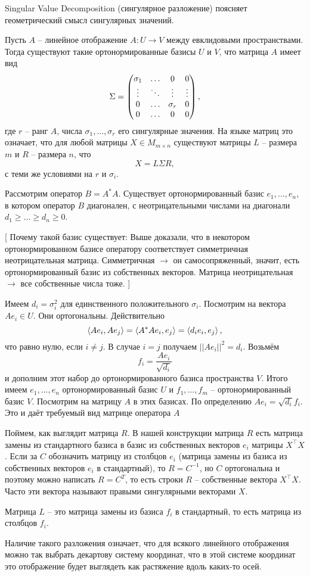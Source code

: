Singular Value Decomposition (сингулярное разложение) поясняет геометрический смысл сингулярных значений.

 Пусть $A$ -- линейное отображение $A\colon U \to V$ между евклидовыми пространствами. Тогда существуют такие ортонормированные базисы $U$ и $V$, что матрица $A$ имеет вид 
$$\Sigma = \begin{pmatrix} \sigma_1 &\dots& 0 & 0\\
 \vdots & \ddots &\vdots & \vdots\\
 0 & \dots & \sigma_r & 0\\
 0 &  \dots & 0 & 0 \end{pmatrix},$$
 где $r$ -- ранг $A$, числа $\sigma_1, \dots, \sigma_r$ его сингулярные значения.
На языке матриц это означает, что для любой матрицы $X \in M_{m\times n}$ существуют матрицы $L$ -- размера $m$ и $R$ -- размера $n$,  что
$$X= L \Sigma R,$$
 с теми же условиями на $r$ и $\sigma_i$.
 
\proof Рассмотрим оператор $B = A^{*}A$. Существует ортонормированный базис $e_1,\dots,e_n$, в котором оператор $B$ диагонален, с неотрицательными числами на диагонали $d_1\geq\dots\geq d_n\geq 0$. 

[ Почему такой базис существует: Выше доказали, что в некотором ортонормированном базисе оператору соответствует симметричная неотрицательная матрица. Симметричная $\to$ он самосопряженный, значит, есть ортонормированный базис из собственных векторов. Матрица неотрицательная $\to$ все собственные числа тоже. ]

Имеем  $d_i=\sigma_i^2$ для единственного положительного $\sigma_i$. 
Посмотрим на вектора $Ae_i \in U$. Они ортогональны. Действительно
$$\left\langle Ae_i, Ae_j\right\rangle = \left\langle A^{*}Ae_i,e_j \right\rangle = \left\langle d_i e_i,e_j\right\rangle,$$
что равно нулю, если $i\neq j$. В случае $i=j$ получаем $||Ae_i||^2=d_i$. Возьмём 
$$f_i=\frac{Ae_i}{\sqrt{d_i}}$$
и дополним этот набор до ортонормированного базиса пространства $V$. Итого имеем $e_1,\dots,e_n$ ортонормированный базис $U$ и $f_1,\dots,f_m$ -- ортонормированный базис $V$.
Посмотрим на матрицу $A$ в этих базисах. По определению $Ae_i=\sqrt{d_i}f_i$. Это и даёт требуемый вид матрице оператора $A$

Поймем, как выглядит матрица $R$. В нашей конструкции матрица $R$ есть матрица замены из стандартного базиса в базис из собственных векторов $e_i$ матрицы $X^{\top}X$. Если за $C$ обозначить матрицу из столбцов $e_i$ (матрица замены из базиса из собственных векторов $e_i$ в стандартный), то $R=C^{-1}$, но $C$ ортогональна и поэтому можно написать $R=C^{T}$, то есть строки $R$ -- собственные вектора $X^{\top}X$. Часто эти вектора называют правыми сингулярными векторами $X$.

Матрица $L$ -- это матрица замены из базиса $f_i$ в стандартный, то есть матрица из столбцов $f_i$.

\endproof
\ethrm

Наличие такого разложения означает, что для всякого линейного отображения можно так выбрать декартову систему координат, что в этой системе координат это отображение будет выглядеть как растяжение вдоль каких-то осей.